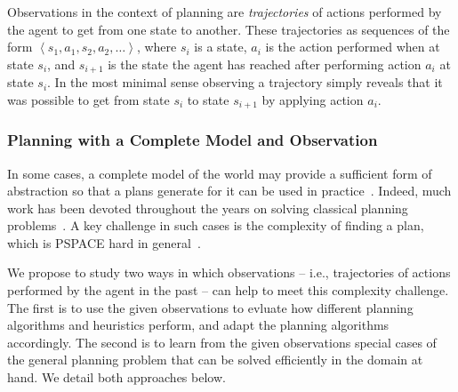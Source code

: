 \documentclass[12pt]{article}
\newcommand{\tuple}[1]{\ensuremath{\left \langle #1 \right \rangle }}
\begin{document}
Observations in the context of planning are {\em trajectories} of actions performed by the agent to get from one state to another. These trajectories as sequences of the form $\tuple{ s_1, a_1, s_2, a_2, \ldots}$, where $s_i$ is a state, $a_i$ is the action performed when at state $s_i$, and $s_{i+1}$ is the state the agent has reached after performing action $a_i$ at state $s_i$. In the most minimal sense observing a trajectory simply reveals that it was possible to get from state $s_i$ to state $s_{i+1}$ by applying action $a_i$. %




\subsubsection{Planning with a Complete Model and Observation}



In some cases, a complete model of the world may provide a sufficient form of abstraction so that a plans generate for it can be used in practice~\cite{citeSomeApplicationsOfPDDLPlanning}. Indeed, much work has been devoted throughout the years on solving classical planning problems~\cite{someManyPlanningPapers}. A key challenge in such cases is the complexity of finding a plan, which is PSPACE hard in general~\cite{bylander1994computational}. 




We propose to study two ways in which observations -- i.e., trajectories of actions performed by the agent in the past -- can help to meet this complexity challenge. The first is to use the given observations to evluate how different planning algorithms and heuristics perform, and adapt the planning algorithms accordingly. The second is to learn from the given observations special cases of the general planning problem that can be solved efficiently in the domain at hand. We detail both  approaches below. 
\end{document}
